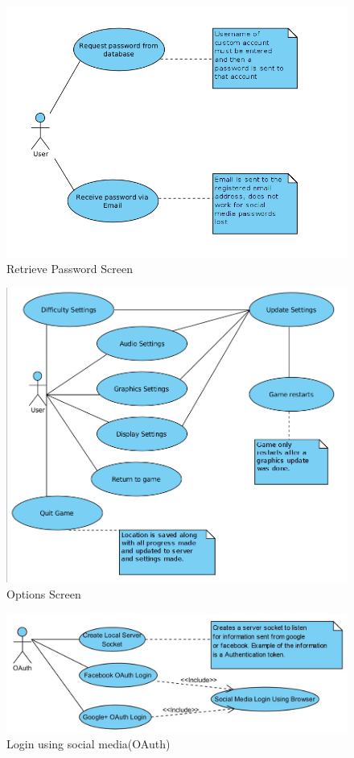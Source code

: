 \documentclass[letterpaper]{article}
\begin{document}
					\begin{figure}[H]
					\centering
					\includegraphics[width=140mm]{UML_Diagram/Use_Case/RetrievePassword_UseCase.jpg}
					\caption{Retrieve Password Screen}
					\end{figure}
				
					\begin{figure}[H]
					\centering
					\includegraphics[width=140mm]{UML_Diagram/Use_Case/OptionsScreen_UseCase.jpg}
					\caption{Options Screen}
					\end{figure}
				
				\begin{figure}[H]
					\centering
					\includegraphics[width=140mm]{UML_Diagram/Use_Case/OAuth.jpg}
					\caption{Login using social media(OAuth)}
					\end{figure}
				
\end{document}
